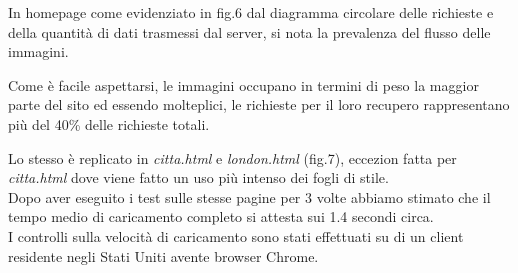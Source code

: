 In homepage come evidenziato in fig.6 dal diagramma circolare delle richieste e della quantità di dati trasmessi dal server, si nota la prevalenza del flusso delle immagini.

Come è facile aspettarsi, le immagini occupano in termini di peso la maggior parte del sito ed essendo molteplici, le richieste per il loro recupero rappresentano più del 40\% delle richieste totali.


\begin{flushleft}
Lo stesso è replicato in \textit{citta.html} e \textit{london.html} (fig.7), eccezion fatta per \textit{citta.html} dove viene fatto un uso più intenso dei fogli di stile.\\
Dopo aver eseguito i test sulle stesse pagine per 3 volte abbiamo stimato che il tempo medio di caricamento completo si attesta sui 1.4 secondi circa.\\

I controlli sulla velocità di caricamento sono stati effettuati su di un client residente negli Stati Uniti avente browser Chrome.

\end{flushleft}


